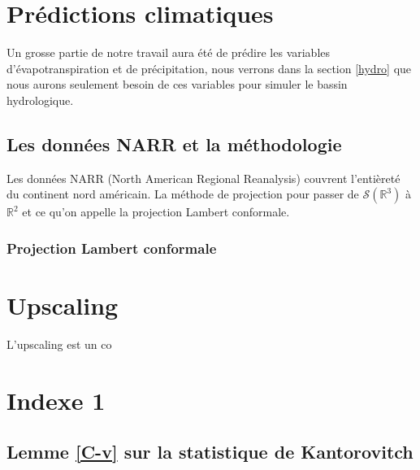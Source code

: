 \documentclass[a4paper,10pt]{article}
\begin{document}
 

\section{Prédictions climatiques}
Un grosse partie de notre travail aura été de prédire les variables d'évapotranspiration et de précipitation, nous verrons dans la section \ref{hydro} que nous aurons seulement besoin de ces variables pour simuler le bassin hydrologique. 

\subsection{Les données NARR et la méthodologie}

Les données NARR (North American Regional Reanalysis) couvrent l'entièreté du continent nord américain. La méthode de projection pour passer de $\mathcal{S}(\mathbb{R}^3)$ à $\mathbb{R}^2$ et ce qu'on appelle la projection Lambert conformale. 
\subsubsection{Projection Lambert conformale}



\section{Upscaling}

L'upscaling est un co

\section{Indexe 1}

\subsection{Lemme \ref{C-v} sur la statistique de Kantorovitch}
\end{document}
